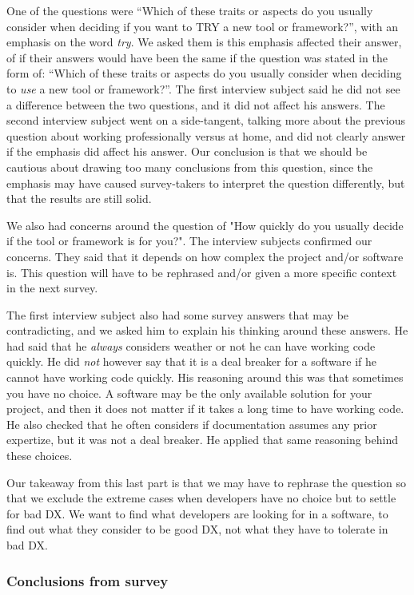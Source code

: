 \documentclass{article}
\begin{document}
One of the questions were “Which of these traits or aspects do you
usually consider when deciding if you want to TRY a new tool or
framework?”, with an emphasis on the word \textit{try}. We asked them is this
emphasis affected their answer, of if their answers would have been the
same if the question was stated in the form of: “Which of these traits
or aspects do you usually consider when deciding to \textit{use} a new tool or
framework?”. The first interview subject said he did not see a
difference between the two questions, and it did not affect his answers.
The second interview subject went on a side-tangent, talking more about
the previous question about working professionally versus at home, and
did not clearly answer if the emphasis did affect his answer. Our
conclusion is that we should be cautious about drawing too many
conclusions from this question, since the emphasis may have caused
survey-takers to interpret the question differently, but that the
results are still solid.

We also had concerns around the question of "How quickly do you usually
decide if the tool or framework is for you?". The interview subjects
confirmed our concerns. They said that it depends on how complex the
project and/or software is. This question will have to be rephrased
and/or given a more specific context in the next survey.

The first interview subject also had some survey answers that may be
contradicting, and we asked him to explain his thinking around these
answers. He had said that he \textit{always} considers weather or not he can
have working code quickly. He did \textit{not} however say that it is a deal
breaker for a software if he cannot have working code quickly. His
reasoning around this was that sometimes you have no choice. A software
may be the only available solution for your project, and then it does
not matter if it takes a long time to have working code. He also checked
that he often considers if documentation assumes any prior expertize,
but it was not a deal breaker. He applied that same reasoning behind
these choices.

Our takeaway from this last part is that we may have to rephrase the
question so that we exclude the extreme cases when developers have no
choice but to settle for bad DX. We want to find what developers are
looking for in a software, to find out what they consider to be good DX,
not what they have to tolerate in bad DX.

\subsubsection{Conclusions from survey}
\end{document}

